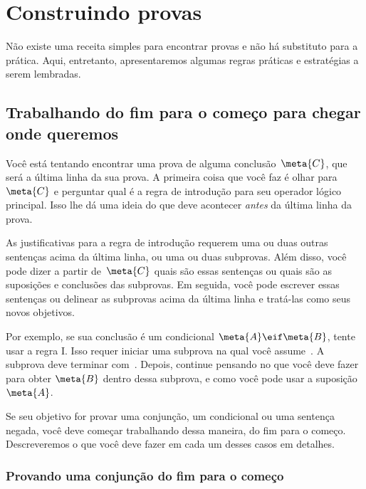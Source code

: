 
\chapter{Construindo provas}\label{s:stratTFL}

 Não existe uma receita simples para encontrar provas e não há substituto para a prática. Aqui, entretanto, apresentaremos algumas regras práticas e estratégias a serem lembradas.

\section{Trabalhando do fim para o começo para chegar onde queremos}

 Você está tentando encontrar uma prova de alguma conclusão~$\meta{C}$, que será a última linha da sua prova. A primeira coisa que você faz é olhar para~$\meta{C}$ e perguntar qual é a regra de introdução para seu operador lógico principal. Isso lhe dá uma ideia do que deve acontecer \emph{antes} da última linha da prova. 

 As justificativas para a regra de introdução requerem uma ou duas outras sentenças acima da última linha, ou uma ou duas subprovas. Além disso, você pode dizer a partir de~$\meta{C}$ quais são essas sentenças ou quais são as suposições e conclusões das subprovas. Em seguida, você pode escrever essas sentenças ou delinear as subprovas acima da última linha e tratá-las como seus novos objetivos.

 Por exemplo, se sua conclusão é um condicional $\meta{A}\eif\meta{B}$,  tente usar a regra {\eif}I.  Isso requer iniciar uma subprova na qual você assume~. A subprova deve terminar com~. Depois, continue pensando no que você deve fazer para obter $\meta{B}$ dentro dessa subprova,  e como você pode usar a suposição~$\meta{A}$.

 Se seu objetivo for provar uma conjunção, um condicional ou uma sentença negada, você deve começar trabalhando dessa maneira, do fim para o começo. Descreveremos o que você deve fazer em cada um desses casos em detalhes.
 
\subsection*{Provando uma conjunção do fim para o começo}

